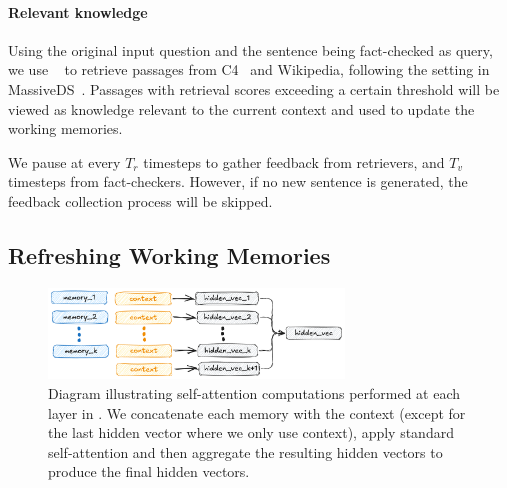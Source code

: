 \paragraph{Relevant knowledge} Using the original input question and the sentence being fact-checked as query, we use \contriever~\citep{izacard2022unsupervised} to retrieve passages from C4~\citep{JMLR:v21:20-074} and Wikipedia, following the setting in MassiveDS~\citep{shao2024scaling}. Passages with retrieval scores exceeding a certain threshold will be viewed as knowledge relevant to the current context and used to update the working memories.


We pause at every $T_r$ timesteps to gather feedback from retrievers, and $T_v$ timesteps from fact-checkers. However, if no new sentence is generated, the feedback collection process will be skipped.


\subsection{Refreshing Working Memories}
\label{sec:memories}


\begin{figure}
    \centering
\includegraphics[width=0.7\textwidth]{figures/memory_arch.png}
    \caption{Diagram illustrating self-attention computations performed at each layer in \model. We concatenate each memory with the context (except for the last hidden vector where we only use context), apply standard self-attention and then aggregate the resulting hidden vectors to produce the final hidden vectors.}
    \label{fig:memory_arch}
\end{figure}

